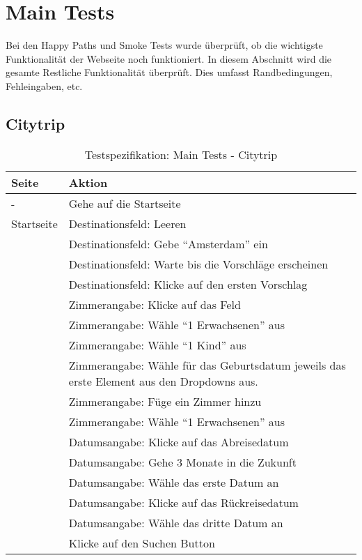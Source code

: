 \section{Main Tests}
Bei den Happy Paths und Smoke Tests wurde überprüft, ob die wichtigste Funktionalität der Webseite noch funktioniert. In diesem Abschnitt wird die gesamte Restliche Funktionalität überprüft. Dies umfasst Randbedingungen, Fehleingaben, etc.

\subsection{Citytrip}

\begin{table}[H] 
	\caption{Testspezifikation: Main Tests - Citytrip}
	\centering
		
	\begin{tabularx}{0.9\textwidth}{ | l | X | } 
		\hline 
		\textbf{Seite} & \textbf{Aktion} \\ \hline 
		\multirow{1}{*}{-} & Gehe auf die Startseite \\ \hline
		\multirow{1}{*}{Startseite} & Destinationsfeld: Leeren \\ \cline{2-2}
		& Destinationsfeld: Gebe "`Amsterdam"' ein \\ \cline{2-2}
		& Destinationsfeld: Warte bis die Vorschläge erscheinen \\ \cline{2-2}
		& Destinationsfeld: Klicke auf den ersten Vorschlag \\ \cline{2-2}
		& Zimmerangabe: Klicke auf das Feld \\ \cline{2-2}
		& Zimmerangabe: Wähle "`1 Erwachsenen"' aus \\ \cline{2-2}
		& Zimmerangabe: Wähle "`1 Kind"' aus \\ \cline{2-2}
		& Zimmerangabe: Wähle für das Geburtsdatum jeweils das erste Element aus den Dropdowns aus.  \\ \cline{2-2}
		& Zimmerangabe: Füge ein Zimmer hinzu \\ \cline{2-2}
		& Zimmerangabe: Wähle "`1 Erwachsenen"' aus \\ \cline{2-2}
		& Datumsangabe: Klicke auf das Abreisedatum \\ \cline{2-2}
		& Datumsangabe: Gehe 3 Monate in die Zukunft \\ \cline{2-2}
		& Datumsangabe: Wähle das erste Datum an \\ \cline{2-2}
		& Datumsangabe: Klicke auf das Rückreisedatum \\ \cline{2-2}
		& Datumsangabe: Wähle das dritte Datum an \\ \cline{2-2}
		& Klicke auf den Suchen Button \\ \hline
		

\end{tabularx}
\end{table}

